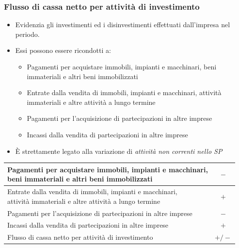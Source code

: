 \documentclass[10pt,a4paper,fleqn,oneside]{book}
\newcommand{\grayrow}{\rowcolor[gray]{.90}}
\begin{document}
\subsubsection{Flusso di cassa netto per attività di investimento}
\begin{itemize}
    \item Evidenzia gli investimenti ed i disinvestimenti effettuati dall’impresa nel
    periodo.
    \item Essi possono essere ricondotti a:
    \begin{itemize}
        \item Pagamenti per acquistare immobili, impianti e macchinari, beni
        immateriali e altri beni immobilizzati
        \item Entrate dalla vendita di immobili, impianti e macchinari, attività
        immateriali e altre attività a lungo termine
        \item Pagamenti per l’acquisizione di partecipazioni in altre imprese
        \item Incassi dalla vendita di partecipazioni in altre imprese
    \end{itemize}
    \item È strettamente legato alla variazione di \emph{attività non correnti nello SP}
\end{itemize}

\begin{tabular}{|l|c|}
    \hline
    \makecell[l]{Pagamenti per acquistare immobili, impianti e macchinari,\\
    beni immateriali e altri beni immobilizzati} & $-$ \\
    \hline
    \makecell[l]{Entrate dalla vendita di immobili, impianti e macchinari,\\
    attività immateriali e altre attività a lungo termine} & $+$ \\
    \hline
    Pagamenti per l’acquisizione di partecipazioni in altre imprese & $-$ \\
    \hline
    Incassi dalla vendita di partecipazioni in altre imprese & $+$ \\
    \hline\grayrow
    Flusso di cassa netto per attività di investimento & $+/-$ \\
    \hline
\end{tabular}
\end{document}
